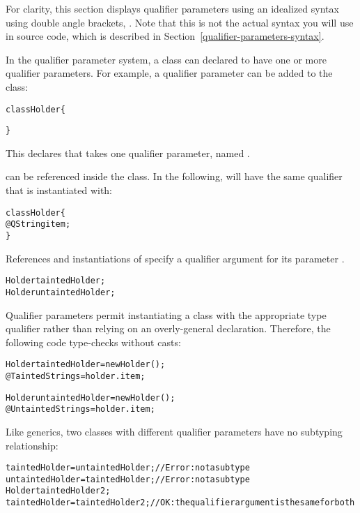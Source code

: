 For clarity, this section displays qualifier parameters using an idealized
syntax using double angle brackets, .
Note that this is not the actual
syntax you will use in source code, which is described in
Section~\ref{qualifier-parameters-syntax}.

In the qualifier parameter system, a class can declared to have one or more
qualifier parameters. For example, a qualifier parameter can be added to the
 class:

\begin{alltt}
    class Holder  \{

    \}
\end{alltt}

\noindent
This declares that  takes one qualifier parameter, named
.

 can be referenced inside the  class. In the
following,  will have the same qualifier that  is
instantiated with:

\begin{alltt}
    class Holder  \{
        @Q String item;
    \}
\end{alltt}

References and instantiations of  specify a qualifier
argument for its parameter .

\begin{alltt}
    Holder taintedHolder;
    Holder untaintedHolder;
\end{alltt}

Qualifier parameters permit instantiating a class with the appropriate type
qualifier rather than relying on an overly-general declaration.  Therefore,
the following code type-checks without casts:

\begin{alltt}
    Holder taintedHolder = new Holder();
    @Tainted String s = holder.item;

    Holder untaintedHolder = new Holder();
    @Untainted String s = holder.item;
\end{alltt}

Like generics, two classes with different
qualifier parameters have no subtyping relationship:

\begin{alltt}
    taintedHolder = untaintedHolder;     // Error: not a subtype
    untaintedHolder = taintedHolder;     // Error: not a subtype
    Holder taintedHolder2;
    taintedHolder = taintedHolder2;      // OK:  the qualifier argument is the same for both
\end{alltt}



